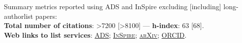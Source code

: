 Summary metrics reported using ADS and InSpire excluding [including] long-authorlist papers:
\\
\textcolor{mark_color}{\textbf{Total number of citations}}: >7200 [>8100]
 --- 
\textcolor{mark_color}{\textbf{h-index}}: 63 [68].
\\
\textcolor{mark_color}{\textbf{Web links to list services}}:
\href{https://davidegerosa.com/myads}{\textsc{ADS}};
\href{https://davidegerosa.com/myinspire}{\textsc{InSpire}};
\href{http://davidegerosa.com/myarxiv}{\textsc{arXiv}};
\href{https://davidegerosa.com/myorcid}{\textsc{ORCID}}.